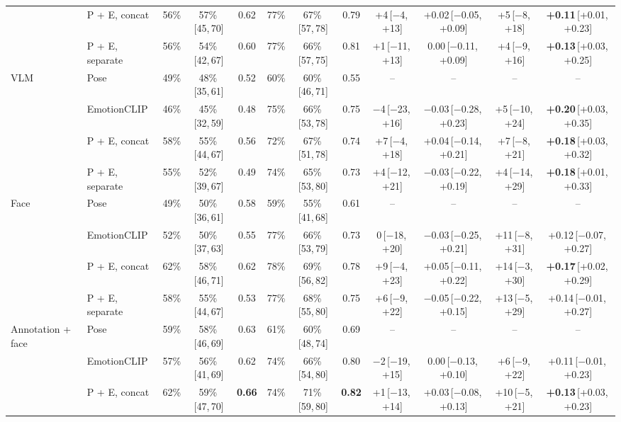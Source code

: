 \documentclass[11pt]{article}
\newcommand{\best}[1]{\textbf{#1}}
\newcommand{\ci}[2]{\,[#1,\,#2]}
\begin{document}
\begin{table}[!htbp]
{\begin{tabular}{llcccccccccc}
 & P + E, concat & 56\% & 57\%\ci{45}{70} & 0.62 & 77\% & 67\%\ci{57}{78} & 0.79 & +4\ci{$-$4}{+13} & +0.02\ci{$-$0.05}{+0.09} & +5\ci{$-$8}{+18} & \best{+0.11}\ci{+0.01}{+0.23} \\
 & P + E, separate & 56\% & 54\%\ci{42}{67} & 0.60 & 77\% & 66\%\ci{57}{75} & 0.81 & +1\ci{$-$11}{+13} & 0.00\ci{$-$0.11}{+0.09} & +4\ci{$-$9}{+16} & \best{+0.13}\ci{+0.03}{+0.25} \\
\midrule
\multirow{4}{*}{VLM} & Pose & 49\% & 48\%\ci{35}{61} & 0.52 & 60\% & 60\%\ci{46}{71} & 0.55 & -- & -- & -- & -- \\
 & EmotionCLIP & 46\% & 45\%\ci{32}{59} & 0.48 & 75\% & 66\%\ci{53}{78} & 0.75 & $-$4\ci{$-$23}{+16} & $-$0.03\ci{$-$0.28}{+0.23} & +5\ci{$-$10}{+24} & \best{+0.20}\ci{+0.03}{+0.35} \\
 & P + E, concat & 58\% & 55\%\ci{44}{67} & 0.56 & 72\% & 67\%\ci{51}{78} & 0.74 & +7\ci{$-$4}{+18} & +0.04\ci{$-$0.14}{+0.21} & +7\ci{$-$8}{+21} & \best{+0.18}\ci{+0.03}{+0.32} \\
 & P + E, separate & 55\% & 52\%\ci{39}{67} & 0.49 & 74\% & 65\%\ci{53}{80} & 0.73 & +4\ci{$-$12}{+21} & $-$0.03\ci{$-$0.22}{+0.19} & +4\ci{$-$14}{+29} & \best{+0.18}\ci{+0.01}{+0.33} \\
\midrule
\multirow{4}{*}{Face} & Pose & 49\% & 50\%\ci{36}{61} & 0.58 & 59\% & 55\%\ci{41}{68} & 0.61 & -- & -- & -- & -- \\
 & EmotionCLIP & 52\% & 50\%\ci{37}{63} & 0.55 & 77\% & 66\%\ci{53}{79} & 0.73 & 0\ci{$-$18}{+20} & $-$0.03\ci{$-$0.25}{+0.21} & +11\ci{$-$8}{+31} & +0.12\ci{$-$0.07}{+0.27} \\
 & P + E, concat & 62\% & 58\%\ci{46}{71} & 0.62 & 78\% & 69\%\ci{56}{82} & 0.78 & +9\ci{$-$4}{+23} & +0.05\ci{$-$0.11}{+0.22} & +14\ci{$-$3}{+30} & \best{+0.17}\ci{+0.02}{+0.29} \\
 & P + E, separate & 58\% & 55\%\ci{44}{67} & 0.53 & 77\% & 68\%\ci{55}{80} & 0.75 & +6\ci{$-$9}{+22} & $-$0.05\ci{$-$0.22}{+0.15} & +13\ci{$-$5}{+29} & +0.14\ci{$-$0.01}{+0.27} \\
\midrule
\multirow{4}{*}{Annotation + face} & Pose & 59\% & 58\%\ci{46}{69} & 0.63 & 61\% & 60\%\ci{48}{74} & 0.69 & -- & -- & -- & -- \\
 & EmotionCLIP & 57\% & 56\%\ci{41}{69} & 0.62 & 74\% & 66\%\ci{54}{80} & 0.80 & $-$2\ci{$-$19}{+15} & 0.00\ci{$-$0.13}{+0.10} & +6\ci{$-$9}{+22} & +0.11\ci{$-$0.01}{+0.23} \\
 & P + E, concat & 62\% & 59\%\ci{47}{70} & \best{0.66} & 74\% & 71\%\ci{59}{80} & \best{0.82} & +1\ci{$-$13}{+14} & +0.03\ci{$-$0.08}{+0.13} & +10\ci{$-$5}{+21} & \best{+0.13}\ci{+0.03}{+0.23} \\

\end{tabular}}
\end{table}
\end{document}
